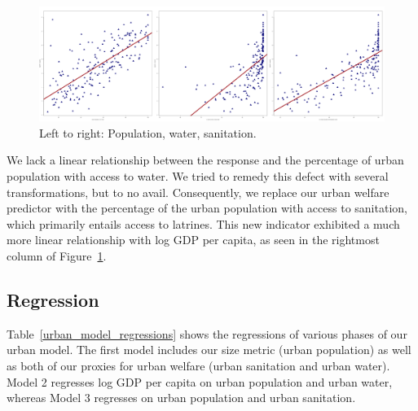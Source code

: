 \documentclass[11pt]{article}
\begin{document}
\begin{figure}[!ht]
\centering
  \includegraphics[width=\textwidth]{images/urban_model_scatter}
  \caption{\label{urban_model_scatter}Left to right: Population, water, sanitation.}
\end{figure}

We lack a linear relationship between the response and the percentage of urban population with access to water. We tried to remedy this defect with several transformations, but to no avail. Consequently, we replace our urban welfare predictor with the percentage of the urban population with access to sanitation, which primarily entails access to latrines. This new indicator exhibited a much more linear relationship with log GDP per capita, as seen in the rightmost column of Figure~\ref{urban_model_scatter}.

\subsection{Regression}

Table~\ref{urban_model_regressions} shows the regressions of various phases of our urban model.
The first model includes our size metric (urban population) as well as both of our proxies for urban welfare (urban sanitation and urban water).
Model 2 regresses log GDP per capita on urban population and urban water, whereas Model 3 regresses on urban population and urban sanitation.
\end{document}
